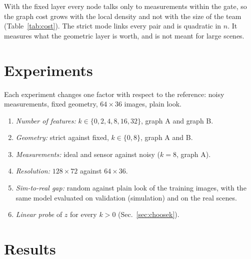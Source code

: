 \documentclass[conference]{IEEEtran}
\begin{document}
With the fixed layer every node talks only to measurements within the gate, so the graph cost grows with the local
density and not with the size of the team (Table~\ref{tab:cost}). The strict mode links every pair and is quadratic
in $n$. It measures what the geometric layer is worth, and is not meant for large scenes.

\section{Experiments}

Each experiment changes one factor with respect to the reference: noisy measurements, fixed geometry, $64\times36$
images, plain look.

\begin{enumerate}
\item \emph{Number of features:} $k\in\{0,2,4,8,16,32\}$, graph A and graph B.
\item \emph{Geometry:} strict against fixed, $k\in\{0,8\}$, graph A and B.
\item \emph{Measurements:} ideal and sensor against noisy ($k=8$, graph A).
\item \emph{Resolution:} $128\times72$ against $64\times36$.
\item \emph{Sim-to-real gap:} random against plain look of the training images, with the same model evaluated on
validation (simulation) and on the real scenes.
\item \emph{Linear probe} of $z$ for every $k>0$ (Sec.~\ref{sec:choosek}).
\end{enumerate}

\section{Results}
\end{document}
